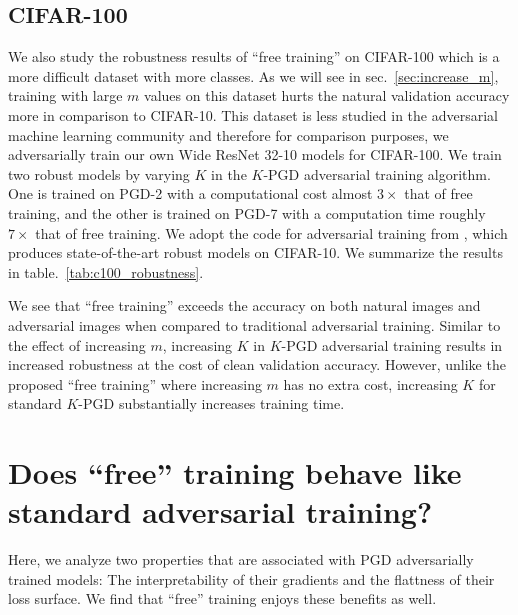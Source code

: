 \documentclass{article}
\begin{document}
\subsection*{CIFAR-100}
We also study the robustness results of ``free training'' on CIFAR-100 which is a more difficult dataset with more classes. As we will see in sec.~\ref{sec:increase_m}, training with large $m$ values on this dataset hurts the natural validation accuracy more in comparison to CIFAR-10. This dataset is less studied in the adversarial machine learning community and therefore for comparison purposes, we adversarially train our own Wide ResNet 32-10 models for CIFAR-100. We train two robust models by varying $K$ in the $K$-PGD adversarial training algorithm. One is trained on PGD-2 with a computational cost almost $3\times$ that of free training, and the other is trained on PGD-7 with a computation time roughly $7\times$ that of free training. We adopt the code for adversarial training from \cite{madry2017towards}, which produces state-of-the-art robust models on CIFAR-10. We summarize the results in table.~\ref{tab:c100_robustness}. 


We see that ``free training'' exceeds the accuracy on both natural images and adversarial images when compared to traditional adversarial training. Similar to the effect of increasing $m$, increasing $K$ in $K$-PGD adversarial training results in increased robustness at the cost of clean validation accuracy. However, unlike the proposed ``free training'' where increasing $m$ has no extra cost, increasing $K$ for standard $K$-PGD substantially increases training time.

\section{Does ``free'' training behave like standard adversarial training?}


Here, we analyze two properties that are associated with PGD adversarially trained models: The interpretability of their gradients and the flattness of their loss surface.  We find that ``free'' training enjoys these benefits as well.
\end{document}

